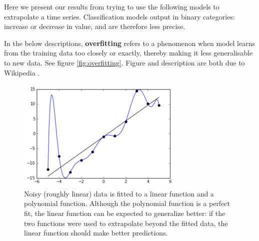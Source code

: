 Here we present our results from trying to use the following models to extrapolate a time series.
Classification models output in binary categories: increase or decrease in value, and are therefore less precise.

In the below descriptions, \textbf{overfitting} refers to a phenomenon when model learns from the training data too closely or exactly, thereby making it less generalisable to new data. See  figure  \autoref{fig:overfitting}. Figure and description are both due to Wikipedia \cite{overfitting}.
\begin{figure}[h!]
	\centering
	\includegraphics[width=0.5\linewidth]{"pictures/overfitted_data.png"}
	\caption{Noisy (roughly linear) data is fitted to a linear function and a polynomial function. Although the polynomial function is a perfect fit, the linear function can be expected to generalize better: if the two functions were used to extrapolate beyond the fitted data, the linear function should make better predictions.}
	\label{fig:overfitting}
\end{figure}

